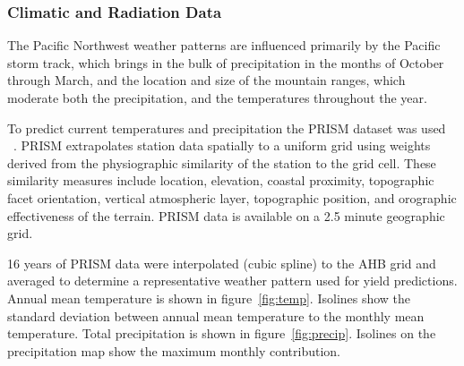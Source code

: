 \documentclass[preprint,review,12pt]{elsarticle}
\begin{document}
\subsubsection{Climatic and Radiation Data}
\label{sec:climate}


The Pacific Northwest weather patterns are influenced primarily by the
Pacific storm track, which brings in the bulk of precipitation in the
months of October through March, and the location and size of the
mountain ranges, which moderate both the precipitation, and the
temperatures throughout the year.

To predict current temperatures and precipitation the \acf{PRISM}
dataset was used ~\cite{Daly2008}.  \ac{PRISM} extrapolates station
data spatially to a uniform grid using weights derived from the
physiographic similarity of the station to the grid cell. These
similarity measures include location, elevation, coastal proximity,
topographic facet orientation, vertical atmospheric layer, topographic
position, and orographic effectiveness of the terrain.  \ac{PRISM}
data is available on a 2.5 minute geographic grid.

16 years of \ac{PRISM} data were interpolated (cubic spline) to the
\ac{AHB} grid and averaged to determine a representative weather
pattern used for yield predictions.  Annual mean temperature is shown
in figure~\ref{fig:temp}. Isolines show the standard deviation between
annual mean temperature to the monthly mean temperature.  Total
precipitation is shown in figure~\ref{fig:precip}.  Isolines on the
precipitation map show the maximum monthly contribution.
\end{document}
